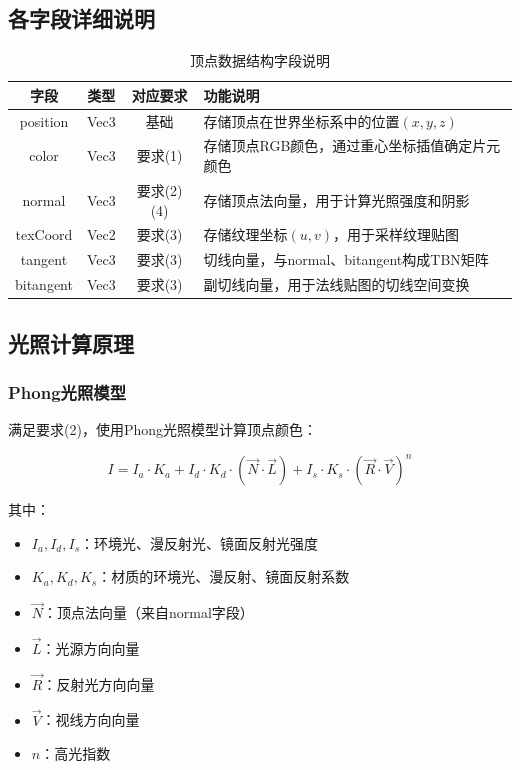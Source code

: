 \documentclass[12pt,a4paper]{article}
\begin{document}
\subsection{各字段详细说明}

\begin{table}[H]
\centering
\caption{顶点数据结构字段说明}
\begin{tabular}{|c|c|c|p{6cm}|}
\hline
\textbf{字段} & \textbf{类型} & \textbf{对应要求} & \textbf{功能说明} \\
\hline
position & Vec3 & 基础 & 存储顶点在世界坐标系中的位置$(x,y,z)$ \\
\hline
color & Vec3 & 要求(1) & 存储顶点RGB颜色，通过重心坐标插值确定片元颜色 \\
\hline
normal & Vec3 & 要求(2)(4) & 存储顶点法向量，用于计算光照强度和阴影 \\
\hline
texCoord & Vec2 & 要求(3) & 存储纹理坐标$(u,v)$，用于采样纹理贴图 \\
\hline
tangent & Vec3 & 要求(3) & 切线向量，与normal、bitangent构成TBN矩阵 \\
\hline
bitangent & Vec3 & 要求(3) & 副切线向量，用于法线贴图的切线空间变换 \\
\hline
\end{tabular}
\end{table}

\subsection{光照计算原理}

\subsubsection{Phong光照模型}

满足要求(2)，使用Phong光照模型计算顶点颜色：

\begin{equation}
I = I_a \cdot K_a + I_d \cdot K_d \cdot (\vec{N} \cdot \vec{L}) + I_s \cdot K_s \cdot (\vec{R} \cdot \vec{V})^n
\end{equation}

其中：
\begin{itemize}
    \item $I_a, I_d, I_s$：环境光、漫反射光、镜面反射光强度
    \item $K_a, K_d, K_s$：材质的环境光、漫反射、镜面反射系数
    \item $\vec{N}$：顶点法向量（来自normal字段）
    \item $\vec{L}$：光源方向向量
    \item $\vec{R}$：反射光方向向量
    \item $\vec{V}$：视线方向向量
    \item $n$：高光指数
\end{itemize}
\end{document}
